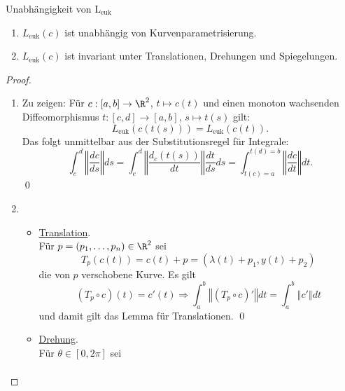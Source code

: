 \begin{lemma}{Unabhängigkeit von $ \text{L}_\text{euk} $}
  \label{lm:leuklinvarianz}
  \begin{enumerate}
    \item $ L_\text{euk}(c) $ ist unabhängig von Kurvenparametrisierung.
    \item $ L_\text{euk}(c) $ ist invariant unter Translationen, Drehungen und Spiegelungen.
  \end{enumerate}
  \begin{proof}
    \begin{enumerate}
      \item Zu zeigen: Für $ c: [a,b] \to \R^2 $, $ t \mapsto c(t) $ und einen monoton wachsenden Diffeomorphismus $ t: [c, d] \to [a,b] $, $ s \mapsto t(s) $ gilt:
      \begin{equation*}
        L_\text{euk}(c(t(s))) = L_\text{euk}(c(t))\text{.}
      \end{equation*}
      Das folgt unmittelbar aus der Substitutionsregel für Integrale:
      \begin{equation*}
        \int_c^d \left\Vert \frac{dc}{ds} \right\Vert ds = \int_c^d \left\Vert \frac{d_c(t(s))}{dt} \right\Vert \frac{dt}{ds}ds = \int_{t(c) = a}^{t(d)=b} \left\Vert \frac{dc}{dt} \right\Vert dt \text{.}
      \end{equation*}\qed
      \item \begin{itemize}
        \item \underline{Translation}. \\ Für $ p = (p_1, \dots, p_n) \in \R^2 $ sei
        \begin{equation*}
           T_p(c(t)) = c(t) + p = (\lambda(t) + p_1, y(t) + p_2)
         \end{equation*} 
         die von $ p $ verschobene Kurve. Es gilt
         \begin{equation*}
           (T_p \circ c)(t) = c'(t) \Rightarrow \int_a^b \left\Vert (T_p \circ c)' \right\Vert dt = \int_a^b \left\Vert c' \right\Vert dt
         \end{equation*}
         und damit gilt das Lemma für Translationen. \qed
        \item \underline{Drehung}. \\
        Für $ \theta \in [0,2\pi] $ sei
        \begin{align*}

\end{align*}
\end{itemize}
\end{enumerate}
\end{proof}
\end{lemma}
